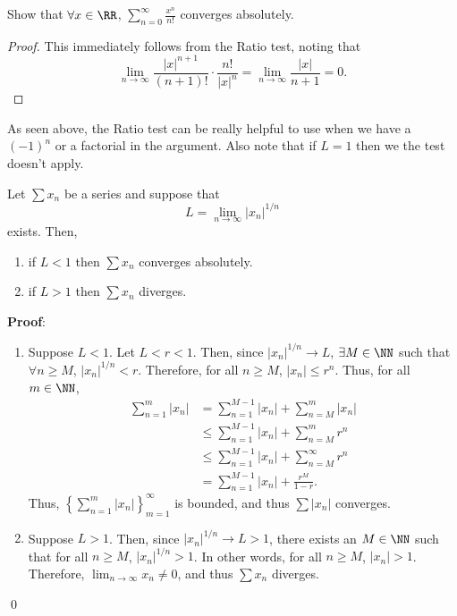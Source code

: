 \begin{example}
Show that $\forall x\in \RR$, $\sum_{n=0}^\infty \frac{x^n}{n!}$ converges absolutely. 
\end{example}
\begin{proof}
This immediately follows from the Ratio test, noting that
    \[
    \lim_{n\to \infty} \frac{|x|^{n+1}}{(n+1)!} \cdot \frac{n!}{|x|^n} = \lim_{n\to \infty} \frac{|x|}{n+1} = 0.
    \]
\end{proof}

\begin{remark}
As seen above, the Ratio test can be really helpful to use when we have a $(-1)^n$ or a factorial in the argument. Also note that if $L = 1$ then we the test doesn't apply.
\end{remark}

\begin{theorem}
Let $\sum x_n$ be a series and suppose that 
\[
L = \lim_{n\to \infty} |x_n|^{1/n}
\]
exists. Then,
\begin{enumerate}
\item if $L<1$ then $\sum x_n$ converges absolutely. 
\item if $L>1$ then $\sum x_n$ diverges.
\end{enumerate}
\end{theorem}
\textbf{Proof}: 
\begin{enumerate}
    \item Suppose $L<1$. Let $L < r < 1$. Then, since $|x_n|^{1/n} \to L$,  $\exists M \in \NN$ such that $\forall n \geq M$, $|x_n|^{1/n} < r$. Therefore, for all $n\geq M$, $|x_n| \leq r^n$. Thus, for all $m\in \NN$,
\begin{align*}
    \sum_{n=1}^m |x_n| &= \sum_{n=1}^{M-1} |x_n| + \sum_{n=M}^m |x_n| \\
    &\leq \sum_{n=1}^{M-1} |x_n| + \sum_{n=M}^m r^n \\
    &\leq \sum_{n=1}^{M-1}|x_n| + \sum_{n=M}^\infty r^n \\
    &= \sum_{n=1}^{M-1} |x_n| + \frac{r^M}{1-r}.
\end{align*}
Thus, $\left\{\sum_{n=1}^m |x_n|\right\}_{m=1}^\infty$ is bounded, and thus $\sum |x_n|$ converges.

    \item Suppose $L>1$. Then, since $|x_n|^{1/n}\to L>1$, there exists an $M\in \NN$ such that for all $n\geq M$, $|x_n|^{1/n} >1$. In other words, for all $n\geq M$, $|x_n| >1$. Therefore, $\lim_{n\to \infty} x_n \neq 0$, and thus $\sum x_n$ diverges.
\end{enumerate}
\qed 

